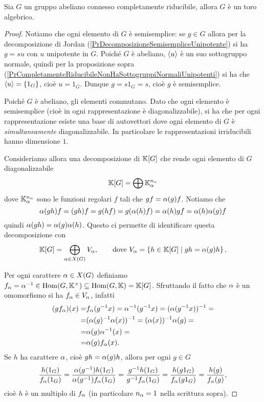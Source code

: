 \begin{theorem}\label{ThAbelianoConnessoCompletamenteRiducibileImplicaToro}
Sia $G$ un gruppo abeliano connesso completamente riducibile, allora $G$ \`e un toro algebrico.
\end{theorem}
\begin{proof}
Notiamo che ogni elemento di $G$ \`e semisemplice: se $g\in G$ allora per la decomposizione di Jordan (\ref{PrDecomposizioneSemisempliceUnipotente}) si ha $g=su$ con $u$ unipotente in $G$. Poich\'e $G$ \`e abeliano, $\left\langle {u}\right\rangle$ \`e un suo sottogruppo normale, quindi per la proposizione sopra (\ref{PrCompletamenteRiducibileNonHaSottogruppiNormaliUnipotenti}) si ha che $\left\langle {u}\right\rangle=\left\{{1_G}\right\}$, cio\`e $u=1_G$. Dunque $g=s1_G=s$, cio\`e $g$ \`e semisemplice.

Poich\'e $G$ \`e abeliano, gli elementi commutano. Dato che ogni elemento \`e semisemplice (cio\`e in ogni rappresentazione \`e diagonalizzabile), si ha che per ogni rappresentazione esiste una base di autovettori dove ogni elemento di $G$ \`e \emph{simultaneamente} diagonalizzabile. In particolare le rappresentazioni irriducibili hanno dimensione $1$.
\smallskip

Consideriamo allora una decomposizione di $\mathbb{K}[G]$ che rende ogni elemento di $G$ diagonalizzabile
\[\mathbb{K}[G]=\bigoplus \mathbb{K}^{n_\alpha}_\alpha\]
dove $\mathbb{K}_\alpha^{n_\alpha}$ sono le funzioni regolari $f$ tali che $gf=\alpha(g)f$. Notiamo che 
\[\alpha(gh)f=(gh)f=g(hf)=g(\alpha(h)f)=\alpha(h)gf=\alpha(h)\alpha(g)f\]
quindi $\alpha(gh)=\alpha(g)\alpha(h)$. Questo ci permette di identificare questa decomposizione con
\[\mathbb{K}[G]=\bigoplus_{\alpha\in X(G)}V_\alpha,\qquad\text{dove }V_\alpha=\left\{{h\in \mathbb{K}[G]\mid gh=\alpha(g)h}\right\}.\]

Per ogni carattere $\alpha\in X(G)$ definiamo $f_\alpha=\alpha^{-1}\in \operatorname{Hom}(G,\mathbb{K}^\times)\subseteq\operatorname{Hom}(G,\mathbb{K})=\mathbb{K}[G]$. Sfruttando il fatto che $\alpha$ \`e un omomorfismo si ha $f_\alpha\in V_\alpha$, infatti
\begin{align*}
    (gf_\alpha)(x)=&f_\alpha(g^{-1} x)=\alpha^{-1}(g^{-1} x)=(\alpha(g^{-1} x))^{-1}=\\
    =&(\alpha(g)^{-1} \alpha(x))^{-1}=(\alpha(x))^{-1}\alpha(g)=\\
    =&\alpha(g) \alpha^{-1}(x)=\\
    =&\alpha(g)f_\alpha(x).
\end{align*}
Se $h$ ha carattere $\alpha$, cio\`e $gh=\alpha(g)h$, allora per ogni $g\in G$
\[\frac{h(1_G)}{f_\alpha(1_G)}=\frac{\alpha(g^{-1})h(1_G)}{\alpha(g^{-1})f_\alpha(1_G)}=\frac{g^{-1} h(1_G)}{g^{-1} f_\alpha(1_G)}=\frac{h(g1_G)}{f_\alpha(g1_G)}=\frac{h(g)}{f_\alpha(g)},\]
cio\`e $h$ \`e un multiplo di $f_\alpha$ (in particolare $n_\alpha=1$ nella scrittura sopra).
\smallskip


\end{proof}
